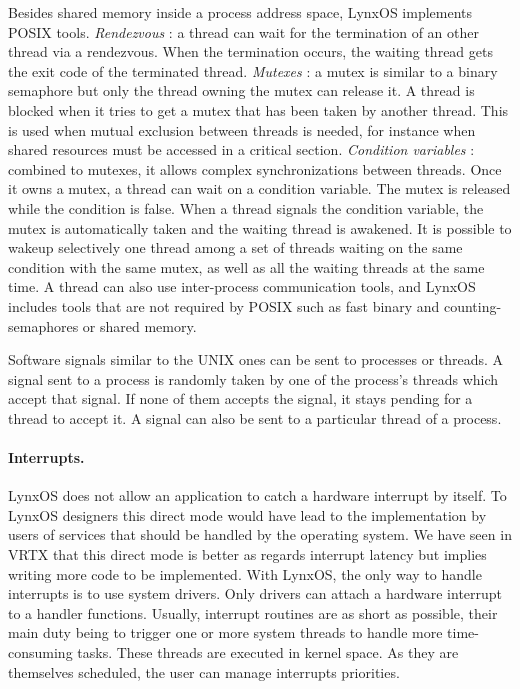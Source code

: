 \documentclass[10pt]{report}
\begin{document}
Besides shared memory inside a process address space, LynxOS implements POSIX tools. {\em Rendezvous} : a thread can wait
for the termination of an other thread via a rendezvous. When the termination occurs, the waiting thread gets the exit code of the 
terminated thread. {\em Mutexes} : a mutex is similar to a binary semaphore but only the thread owning the mutex can release it. 
A thread is blocked when it tries to get a mutex that has been taken by another thread. This is used when mutual exclusion between threads 
is needed, for instance when shared resources must be accessed in a critical section. {\em Condition variables} : combined to mutexes, 
it allows complex synchronizations between threads. Once it owns a mutex, a thread can wait on a condition variable. The mutex is released 
while the condition is false. When a thread signals the condition variable, the mutex is automatically taken and the waiting thread is 
awakened. It is possible to wakeup selectively one thread among a set of threads waiting on the same condition with the same mutex, as well 
as all the waiting threads at the same time. A thread can also use inter-process communication tools, and LynxOS includes tools that
are not required by POSIX such as fast binary and counting-semaphores or shared memory.

Software signals similar to the UNIX ones can be sent to processes or threads. A signal sent to a process is randomly taken by one of the 
process's threads which accept that signal. If none of them accepts the signal, it stays pending for a thread to accept it. A signal can also 
be sent to a particular thread of a process.

\paragraph{Interrupts.} LynxOS does not allow an application to catch a hardware interrupt by itself. To LynxOS designers
this direct mode would have lead to the implementation by users of services that should be handled by the operating system. We have seen
in VRTX that this direct mode is better as regards interrupt latency but implies writing more code to be implemented. With LynxOS, the only 
way to handle interrupts is to use system drivers. Only drivers can attach a hardware interrupt to a handler functions. Usually,
interrupt routines are as short as possible, their main duty being to trigger one or more system threads to handle more time-consuming tasks. 
These threads are executed in kernel space. As they are themselves scheduled, the user can manage interrupts priorities.
\end{document}
